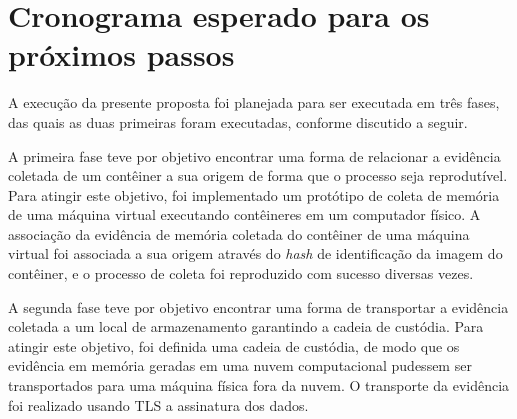 
%


\section{Cronograma esperado para os próximos passos}
\label{sec:proposta-prox}


A execução da presente proposta foi planejada para ser executada em três fases, das quais as duas primeiras foram executadas, conforme discutido a seguir.


A primeira fase teve por objetivo encontrar uma forma de relacionar a evidência coletada de um contêiner a sua origem de forma que o processo seja reprodutível. 
%
Para atingir este objetivo, foi implementado um protótipo de coleta de memória de uma máquina virtual executando contêineres em um computador físico. 
%
A associação da evidência de memória coletada do contêiner de uma máquina virtual foi associada a sua origem através do \textit{hash} de identificação da imagem do contêiner, e o processo de coleta foi reproduzido com sucesso diversas vezes.


A segunda fase teve por objetivo encontrar uma forma de transportar a evidência coletada a um local de armazenamento garantindo a cadeia de custódia.
%
Para atingir este objetivo, foi definida uma cadeia de custódia, de modo que os evidência em memória geradas em uma nuvem computacional pudessem ser transportados para uma máquina física fora da nuvem.
%
O transporte da evidência foi realizado usando TLS a assinatura dos dados.


